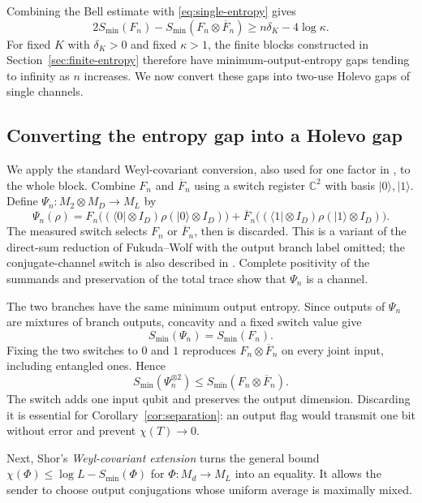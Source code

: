 \documentclass[11pt]{article}
\numberwithin{equation}{section}
\theoremstyle{boldremark}\newtheorem{remark}[theorem]{Remark}
\newcommand{\C}{\mathbb C}
\newcommand{\M}{M}
\newcommand{\smin}{S_{\min}}
\newcommand{\ket}[1]{\lvert #1\rangle}
\newcommand{\bra}[1]{\langle #1\rvert}
\begin{document}
Combining the Bell estimate with \eqref{eq:single-entropy} gives
\begin{equation}
 2\smin(F_n)-\smin(F_n\otimes\overline F_n)
 \ge n\delta_K-4\log\kappa.
 \label{eq:moe}
\end{equation}
For fixed $K$ with $\delta_K>0$ and fixed $\kappa>1$, the finite
blocks constructed in Section~\ref{sec:finite-entropy} therefore have
minimum-output-entropy gaps tending to infinity as $n$ increases.
We now convert these gaps into two-use Holevo gaps of single channels.

\subsection{Converting the entropy gap into a Holevo gap}
\label{sec:conversion}

We apply the standard Weyl-covariant conversion, also used for one
factor in \cite[Section~6]{ZZCW}, to the whole block.
Combine $F_n$ and $\overline F_n$ using a switch register
$\C^2$ with basis $\ket0,\ket1$. Define
$\Psi_n:\M_2\otimes\M_D\to\M_L$ by
\[
 \Psi_n(\rho)=F_n\bigl((\bra0\otimes I_D)\rho(\ket0\otimes I_D)\bigr)
 +\overline F_n\bigl((\bra1\otimes I_D)\rho(\ket1\otimes I_D)\bigr).
\]
The measured switch selects $F_n$ or $\overline F_n$, then is
discarded. This is a variant of the direct-sum reduction of Fukuda--Wolf
\cite[Propositions~1--2]{FW} with the output branch label omitted;
the conjugate-channel switch is also described in
\cite[arXiv version, p.~2]{Hastings}. Complete positivity of the
summands and preservation of the total trace show that $\Psi_n$
is a channel.

The two branches have the same minimum output entropy. Since outputs
of $\Psi_n$ are mixtures of branch outputs, concavity and a fixed
switch value give
\[
 \smin(\Psi_n)=\smin(F_n).
\]
Fixing the two switches to $0$ and $1$ reproduces
$F_n\otimes\overline F_n$ on every joint input, including entangled
ones. Hence
\[
 \smin(\Psi_n^{\otimes2})
 \le\smin(F_n\otimes\overline F_n).
\]
The switch adds one input qubit and preserves the output dimension.
Discarding it is essential for Corollary~\ref{cor:separation}: an
output flag would transmit one bit without error and prevent
$\chi(T)\to0$.

Next, Shor's \emph{Weyl-covariant extension}
\cite[Section~9]{Shor} turns the general bound
$\chi(\Phi)\le\log L-\smin(\Phi)$ for $\Phi:\M_d\to\M_L$ into
an equality. It allows the sender to choose output conjugations
whose uniform average is maximally mixed.
\end{document}
